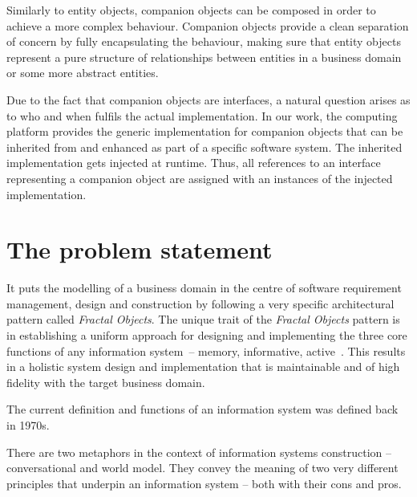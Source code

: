 \documentclass[a4paper,10pt,oneside,openright,final]{memoir} %
\begin{document}
  Similarly to entity objects, companion objects can be composed in order to achieve a more complex behaviour.
  Companion objects provide a clean separation of concern by fully encapsulating the behaviour, making sure that entity objects represent a pure structure of relationships between entities in a business domain or some more abstract entities.
  
  Due to the fact that companion objects are interfaces, a natural question arises as to who and when fulfils the actual implementation.
  In our work, the computing platform provides the generic implementation for companion objects that can be inherited from and enhanced as part of a specific software system.
  The inherited implementation gets injected at runtime.
  Thus, all references to an interface representing a companion object are assigned with an instances of the injected implementation.




























\section*{The problem statement}

	It puts the modelling of a business domain in the centre of software requirement management, design and construction by following a very specific architectural pattern called \emph{Fractal Objects}.
	The unique trait of the \emph{Fractal Objects} pattern is in establishing a uniform approach for designing and implementing the three core functions of any information system~-- memory, informative, active~\cite{oli2007}.
	This results in a holistic system design and implementation that is maintainable and of high fidelity with the target business domain.

	The current definition and functions of an information system was defined back in 1970s.
	

	
	There are two metaphors in the context of information systems construction -- conversational and world model.
	They convey the meaning of two very different principles that underpin an information system -- both with their cons and pros.
	
\end{document}
